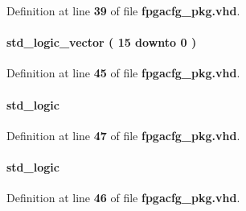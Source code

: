 Definition at line {\bf 39} of file {\bf fpgacfg\+\_\+pkg.\+vhd}.

\paragraph[{wfm\+\_\+ch\+\_\+en}]{ {\bfseries \textcolor{comment}{std\+\_\+logic\+\_\+vector}\textcolor{vhdlchar}{ }\textcolor{vhdlchar}{(}\textcolor{vhdlchar}{ }\textcolor{vhdlchar}{ } \textcolor{vhdldigit}{15} \textcolor{vhdlchar}{ }\textcolor{keywordflow}{downto}\textcolor{vhdlchar}{ }\textcolor{vhdlchar}{ } \textcolor{vhdldigit}{0} \textcolor{vhdlchar}{ }\textcolor{vhdlchar}{)}\textcolor{vhdlchar}{ }} \hspace{0.3cm}{\ttfamily [Record]}}\label{classfpgacfg__pkg_ac4e78381ed5aa0f282ef6302ce8925a9}


Definition at line {\bf 45} of file {\bf fpgacfg\+\_\+pkg.\+vhd}.

\paragraph[{wfm\+\_\+load}]{ {\bfseries \textcolor{comment}{std\+\_\+logic}\textcolor{vhdlchar}{ }} \hspace{0.3cm}{\ttfamily [Record]}}\label{classfpgacfg__pkg_a8b7989a0d84edcea2673e5e719a405fb}


Definition at line {\bf 47} of file {\bf fpgacfg\+\_\+pkg.\+vhd}.

\paragraph[{wfm\+\_\+play}]{ {\bfseries \textcolor{comment}{std\+\_\+logic}\textcolor{vhdlchar}{ }} \hspace{0.3cm}{\ttfamily [Record]}}\label{classfpgacfg__pkg_a0f33477a14c2eb65b8048a79185f9fff}


Definition at line {\bf 46} of file {\bf fpgacfg\+\_\+pkg.\+vhd}.

